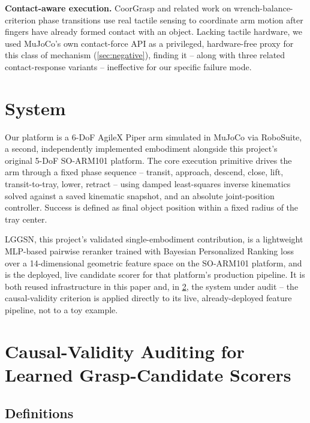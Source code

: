 \documentclass[journal]{IEEEtran}
\begin{document}
\textbf{Contact-aware execution.} CoorGrasp \cite{coorgrasp2026} and
related work on wrench-balance-criterion phase transitions use real
tactile sensing to coordinate arm motion after fingers have already
formed contact with an object. Lacking tactile hardware, we used
MuJoCo's own contact-force API as a privileged, hardware-free proxy for
this class of mechanism (\cref{sec:negative}), finding it -- along with
three related contact-response variants -- ineffective for our specific
failure mode.

\section{System}
\label{sec:system}

Our platform is a 6-DoF AgileX Piper arm simulated in MuJoCo via
RoboSuite, a second, independently implemented embodiment alongside this
project's original 5-DoF SO-ARM101 platform. The core execution primitive
drives the arm through a fixed phase sequence -- transit, approach,
descend, close, lift, transit-to-tray, lower, retract -- using damped
least-squares inverse kinematics solved against a saved kinematic
snapshot, and an absolute joint-position controller. Success is defined as
final object position within a fixed radius of the tray center.

LGGSN, this project's validated single-embodiment contribution, is a
lightweight MLP-based pairwise reranker trained with Bayesian Personalized
Ranking loss over a 14-dimensional geometric feature space on the SO-ARM101
platform, and is the deployed, live candidate scorer for that platform's
production pipeline. It is both reused infrastructure in this paper and,
in \cref{sec:method}, the system under audit -- the causal-validity
criterion is applied directly to its live, already-deployed feature
pipeline, not to a toy example.

\section{Causal-Validity Auditing for Learned Grasp-Candidate Scorers}
\label{sec:method}

\subsection{Definitions}
\end{document}

